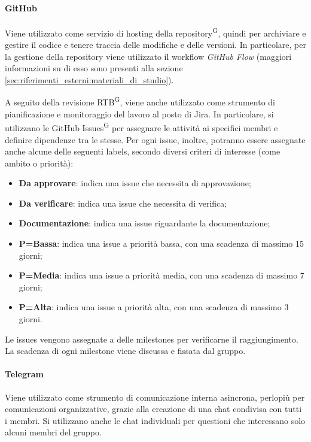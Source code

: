 \paragraph{GitHub}
Viene utilizzato come servizio di hosting della repository\textsuperscript{G}, quindi per archiviare e gestire il codice e tenere traccia delle modifiche e delle versioni. In particolare, per la gestione della repository viene utilizzato il workflow \textit{GitHub Flow} (maggiori informazioni su di esso sono presenti alla sezione \ref{sec:riferimenti_esterni:materiali_di_studio}).

A seguito della revisione RTB\textsuperscript{G}, viene anche utilizzato come strumento di pianificazione e monitoraggio del lavoro al posto di Jira. In particolare, si utilizzano le GitHub Issues\textsuperscript{G} per assegnare le attività ai specifici membri e definire dipendenze tra le stesse. Per ogni issue, inoltre, potranno essere assegnate anche alcune delle seguenti labels, secondo diversi criteri di interesse (come ambito o priorità):
\begin{itemize}
    \item \textbf{Da approvare}: indica una issue che necessita di approvazione;
    \item \textbf{Da verificare}: indica una issue che necessita di verifica;
    \item \textbf{Documentazione}: indica una issue riguardante la documentazione;
    \item \textbf{P=Bassa}: indica una issue a priorità bassa, con una scadenza di massimo 15 giorni;
    \item \textbf{P=Media}: indica una issue a priorità media, con una scadenza di massimo 7 giorni;
    \item \textbf{P=Alta}: indica una issue a priorità alta, con una scadenza di massimo 3 giorni.
\end{itemize}
Le issues vengono assegnate a delle milestones per verificarne il raggiungimento. La scadenza di ogni milestone viene discussa e fissata dal gruppo. 

\paragraph{Telegram}
Viene utilizzato come strumento di comunicazione interna asincrona, perlopiù per comunicazioni organizzative, grazie alla creazione di una chat condivisa con tutti i membri. Si utilizzano anche le chat individuali per questioni che interessano solo alcuni membri del gruppo.

